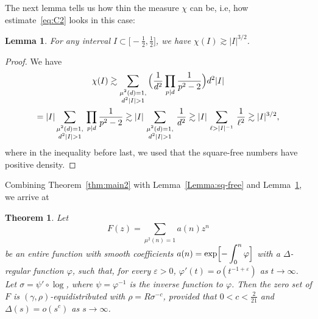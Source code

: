 \documentclass[11pt]{amsart}
\numberwithin{equation}{section}
\newtheorem{theorem}{Theorem}
\newtheorem{lemma}{Lemma}[section]
\def\ep{{\varepsilon}}
\begin{document}
The next lemma tells us how thin the measure $\chi$ can be, i.e, how
estimate~\eqref{eq:C2} looks in this case:

\begin{lemma}\label{lemma:sq-free-spectral2}
For any interval $I\subset \bigl[ -\tfrac12, \tfrac12]$,
we have $\chi (I)\gtrsim |I|^{3/2}$.
\end{lemma}

\begin{proof}
We have
\begin{multline*}
\chi(I)\gtrsim \sum_{\substack{\mu^2(d)=1,\\ d^2|I|>1}}\, \Bigl(\frac1{d^2}\prod_{p | d} \frac1{p^2-2}
\Bigr)d^2|I| \\
=|I|\sum_{\substack{\mu^2(d)=1,\\ d^2|I|>1}}\, \prod_{p | d} \frac1{p^2-2}
\gtrsim |I|\, \sum_{\substack{\mu^2(d)=1,\\ d^2|I|>1}}\, \frac1{d^2}
\gtrsim |I|\, \sum_{\ell>|I|^{-1}}\, \frac1{\ell^2} \gtrsim |I|^{3/2},
\end{multline*}
where in the inequality before last, we used that the square-free numbers have positive density.
\end{proof}

Combining Theorem~\ref{thm:main2} with Lemma~\ref{Lemma:sq-free} and Lemma~\ref{lemma:sq-free-spectral2}, we arrive at

\begin{theorem}\label{thm:sq-free}
Let
\[
F(z) = \sum_{\mu^2(n)=1} a(n) z^n
\]
be an entire function with smooth coefficients
$ a(n) = \displaystyle \exp\Bigl[ - \int_0^n \varphi \Bigr] $ with a $\Delta$-regular function
$\varphi$, such that, for every $\ep>0$, $\varphi'(t) = o(t^{-1+\ep})$ as $t\to\infty$.
Let $\sigma = \psi' \circ \log$, where $\psi=\varphi^{-1}$ is the inverse function to $\varphi$.
Then the zero set of $F$ is $(\gamma, \rho)$-equidistributed with $\rho = R\sigma^{-c}$, provided that $0<c<\tfrac2{21}$ and $\Delta (s) = o(s^c)$ as $s\to\infty$.
\end{theorem}
\end{document}
